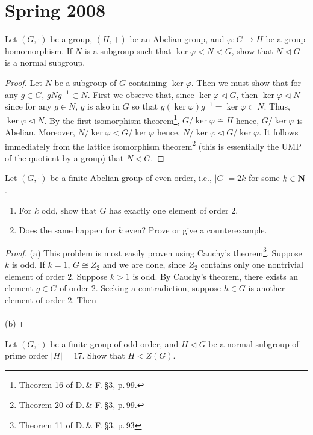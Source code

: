 \chapter{Spring 2008}
\begin{problem}
Let $(G,\cdot)$ be a group, $(H,+)$ be an Abelian group, and
$\varphi\colon G\to H$ be a group homomorphism. If $N$ is a subgroup such
that $\ker\varphi<N<G$, show that $N\lhd G$ is a normal subgroup.
\end{problem}
\begin{proof}
Let $N$ be a subgroup of $G$ containing $\ker\varphi$. Then we must show
that for any $g\in G$, $gNg^{-1}\subset N$. First we observe that, since
$\ker\varphi\lhd G$, then $\ker\varphi\lhd N$ since for any $g\in N$, $g$
is also in $G$ so that $g(\ker\varphi)g^{-1}=\ker\varphi\subset N$. Thus,
$\ker\varphi\lhd N$. By the first isomorphism theorem\footnote{Theorem 16
  of D.\,\& F.\,\S3, p.\,99.}, $G/\ker\varphi\cong H$ hence,
$G/\ker\varphi$ is Abelian. Moreover, $N/\ker\varphi<G/\ker\varphi$ hence,
$N/\ker\varphi\lhd G/\ker\varphi$. It follows immediately from the lattice
isomorphism theorem\footnote{Theorem 20 of D.\,\& F.\,\S3, p.\,99.} (this
is essentially the UMP of the quotient by a group) that $N\lhd G$.
\end{proof}
\begin{problem}
Let $(G,\cdot)$ be a finite Abelian group of even order, i.e., $|G|=2k$ for
some $k\in\mathbf{N}$.
\begin{enumerate}[noitemsep,label=(\alph*)]
\item For $k$ odd, show that $G$ has exactly one element of order $2$.
\item Does the same happen for $k$ even? Prove or give a counterexample.
\end{enumerate}
\end{problem}
\begin{proof}
(a) This problem is most easily proven using Cauchy's
theorem\footnote{Theorem 11 of D.\,\& F.\,\S3, p.\,93}. Suppose $k$ is
odd. If $k=1$, $G\cong Z_2$ and we are done, since $Z_2$ contains only one
nontrivial element of order $2$. Suppose $k>1$ is odd. By Cauchy's theorem,
there exists an element $g\in G$ of order $2$. Seeking a contradiction,
suppose $h\in G$ is another element of order $2$. Then
\\\\
(b)
\end{proof}
\begin{problem}
Let $(G,\cdot)$ be a finite group of odd order, and $H\lhd G$ be a normal
subgroup of prime order $|H|=17$. Show that $H<Z(G)$.
\end{problem}
